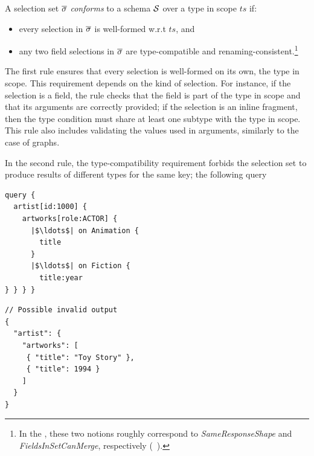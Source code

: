 \begin{definition}
A \gql selection set $\overline{\sigma}$ \textit{conforms} to a schema $\mathcal{S}$
over a type in scope $\mathit{ts}$ if:
\begin{itemize}
\item every selection in $\overline{\sigma}$ is well-formed w.r.t $\mathit{ts}$, and

\item any two field selections in $\overline{\sigma}$
  are type-compatible and
  renaming-consistent.\footnote{In the \spec, these two notions roughly correspond to \emph{SameResponseShape} and
    \emph{FieldsInSetCanMerge}, respectively (\cf~\cite[\S5.3.2]{gqlspec}).}
\end{itemize}
\end{definition}


The first rule ensures that every selection is well-formed on its own,
\wrt the type in scope. This requirement depends on the
kind of selection. For instance, if the selection is a field, the rule
checks that the field is part of the type in scope and that its
arguments are correctly provided; if the selection is an inline
fragment, then the type condition must share at least one subtype with
the type in scope. This rule also includes validating the values used
in arguments, similarly to the case of graphs.

In the second rule, the type-compatibility requirement forbids the
selection set to produce results of different types for the same key; \eg the following query

\smallskip

\begin{minipage}[t]{.22\textwidth}
\begin{verbatim}
query {
  artist[id:1000] {
    artworks[role:ACTOR] {
      |$\ldots$| on Animation {
        title
      }
      |$\ldots$| on Fiction {
        title:year
} } } }
\end{verbatim}
\end{minipage}%
\begin{minipage}[t]{.22\textwidth}
\begin{verbatim}
// Possible invalid output
{
  "artist": {
    "artworks": [
     { "title": "Toy Story" },
     { "title": 1994 }
    ]
  }
}
\end{verbatim}
\end{minipage}

\medskip

